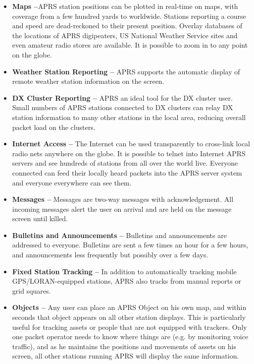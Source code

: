 \begin{itemize}

\item \textbf{Maps --}APRS station positions can be plotted in real-time on maps,
with coverage from a few hundred yards to worldwide. Stations reporting
a course and speed are dead-reckoned to their present position. Overlay
databases of the locations of APRS digipeaters, US National Weather
Service sites and even amateur radio stores are available. It is possible to
zoom in to any point on the globe.


\item \textbf{Weather Station Reporting --} APRS supports the automatic display of
remote weather station information on the screen.

\item \textbf{DX Cluster Reporting --} APRS an ideal tool for the DX cluster user.
Small numbers of APRS stations connected to DX clusters can relay DX
station information to many other stations in the local area, reducing
overall packet load on the clusters.

\item \textbf{Internet Access --} The Internet can be used transparently to cross-link
local radio nets anywhere on the globe. It is possible to telnet into
Internet APRS servers and see hundreds of stations from all over the
world live. Everyone connected can feed their locally heard packets into
the APRS server system and everyone everywhere can see them.

\item \textbf{Messages --} Messages are two-way messages with acknowledgement.
All incoming messages alert the user on arrival and are held on the
message screen until killed.


\item \textbf{Bulletins and Announcements --} Bulletins and announcements are
addressed to everyone. Bulletins are sent a few times an hour for a few
hours, and announcements less frequently but possibly over a few days.

\item \textbf{Fixed Station Tracking --} In addition to automatically tracking mobile
GPS/LORAN-equipped stations, APRS also tracks from manual reports
or grid squares.

\item \textbf{Objects --} Any user can place an APRS Object on his own map, and
within seconds that object appears on all other station displays. This is
particularly useful for tracking assets or people that are not equipped
with trackers. Only one packet operator needs to know where things are
(e.g. by monitoring voice traffic), and as he maintains the positions and
movements of assets on his screen, all other stations running APRS will
display the same information.


\end{itemize}
